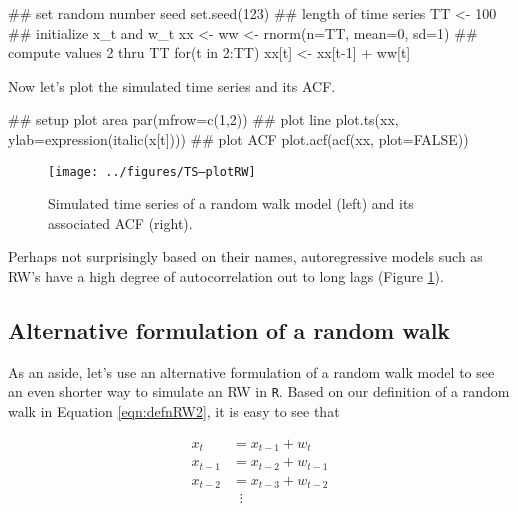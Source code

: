 \begin{Schunk}
\begin{Sinput}
 ## set random number seed
 set.seed(123)
 ## length of time series
 TT <- 100
 ## initialize {x_t} and {w_t}
 xx <- ww <- rnorm(n=TT, mean=0, sd=1)
 ## compute values 2 thru TT
 for(t in 2:TT) { xx[t] <- xx[t-1] + ww[t] }
\end{Sinput}
\end{Schunk}

Now let's plot the simulated time series and its ACF.

\begin{Schunk}
\begin{Sinput}
 ## setup plot area
 par(mfrow=c(1,2))
 ## plot line
 plot.ts(xx, ylab=expression(italic(x[t])))
 ## plot ACF
 plot.acf(acf(xx, plot=FALSE))
\end{Sinput}
\end{Schunk}


\begin{figure}[htp]
\begin{center}
\texttt{[image: ../figures/TS--plotRW]}
\end{center}
\caption{Simulated time series of a random walk model (left) and its associated ACF (right).}
\label{fig:LW1.figRWdataACF}
\end{figure}

\noindent Perhaps not surprisingly based on their names, autoregressive models such as RW's have a high degree of autocorrelation out to long lags (Figure \ref{fig:LW1.figRWdataACF}).

\subsection{Alternative formulation of a random walk}

As an aside, let's use an alternative formulation of a random walk model to see an even shorter way to simulate an RW in \texttt{R}.  Based on our definition of a random walk in Equation \eqref{eqn:defnRW2}, it is easy to see that

\begin{equation}\label{eqn:defnRWalt}
  \begin{aligned}
  x_t &= x_{t-1} + w_t \\
  x_{t-1} &= x_{t-2} + w_{t-1} \\
  x_{t-2} &= x_{t-3} + w_{t-2} \\
  &\; \; \vdots
  \end{aligned}
\end{equation}

